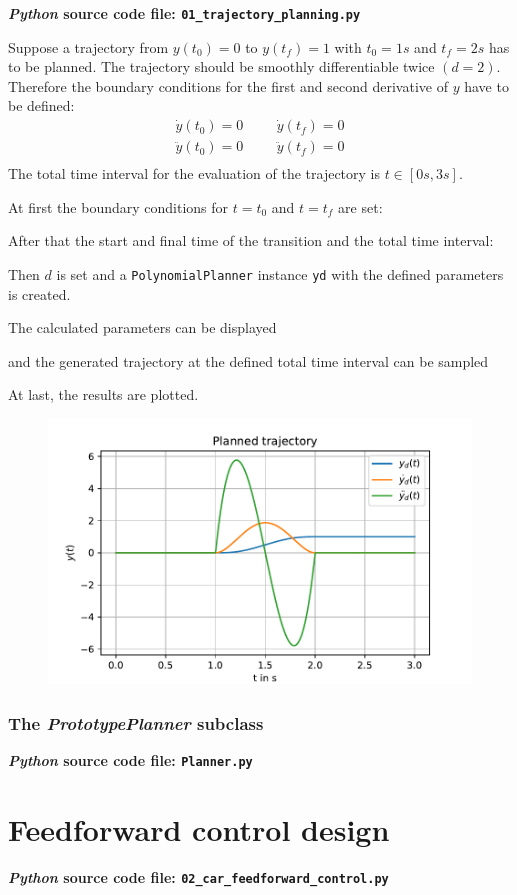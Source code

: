 \documentclass[a4paper,11pt,headings=standardclasses,parskip=half]{scrartcl}
\newcommand{\listcode}[3]{}
\newcommand{\listcodeplanning}[2]{\listcode{#1}{#2}{../sim/01_trajectory_planning.py}}
\newcommand{\py}{\emph{Python}\xspace}
\begin{document}
\textbf{\py source code file: \texttt{01\_trajectory\_planning.py}}

Suppose a trajectory from $y(t_0)=0$ to $y(t_f) = 1$ with $t_0=1s$ and $t_f = 2s$ has to be planned. The trajectory should be smoothly differentiable twice $(d=2)$. Therefore the boundary conditions for the first and second derivative of $y$ have to be defined: 
\begin{align*}
\dot{y}(t_0)=0 &&& \dot{y}(t_f)=0 \\
\ddot{y}(t_0)=0 &&& \ddot{y}(t_f)=0 \\
\end{align*}
The total time interval for the evaluation of the trajectory is $t\in[0s,3s]$.

At first the boundary conditions for $t=t_0$ and $t=t_f$ are set:
\listcodeplanning{7}{8}
After that the start and final time of the transition and the total time interval:
\listcodeplanning{9}{11}
Then $d$ is set and a \texttt{PolynomialPlanner} instance \texttt{yd} with the defined parameters is created.
\listcodeplanning{12}{13}
The calculated parameters can be displayed
\listcodeplanning{15}{16}
and the generated trajectory at the defined total time interval can be sampled
\listcodeplanning{18}{19}
At last, the results are plotted.
\listcodeplanning{21}{27}
\begin{figure}[ht]
\centering
\includegraphics[scale=0.9]{img/planned_trajectory.pdf}
\end{figure}
\subsubsection{The \emph{PrototypePlanner} subclass}
\textbf{\py source code file: \texttt{Planner.py}}
\newpage
\section{Feedforward control design}
\label{sec:ffcontrol}
\textbf{\py source code file: \texttt{02\_car\_feedforward\_control.py}}
\end{document}
